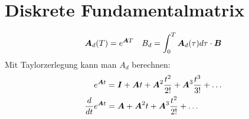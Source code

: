     \section{Diskrete Fundamentalmatrix}
    \begin{tcolorbox}[colback=white!10!white,colframe=green!30!black,title=Definition] 
        \begin{align*}
            \boldsymbol{A}_d(T)= e^{\boldsymbol{A}T} && B_d = \int_{0}^{T}\boldsymbol{A}_d
        (\tau)d\tau    \cdot \boldsymbol{B} 
\end{align*}
Mit Taylorzerlegung kann man $A_d$ berechnen:
\begin{align*}
    e^{\boldsymbol{A}t}  &= \boldsymbol{I} + \boldsymbol{A}t+\boldsymbol{A}^2\frac{t^2}{2!} + \boldsymbol{A}^3\frac{t^3}{3!}+ \ldots\\
    \frac{d}{dt}e^{\boldsymbol{A}t} &= \boldsymbol{A} + \boldsymbol{A}^2t+\boldsymbol{A}^3\frac{t^2}{2!} + \ldots
\end{align*}
    \end{tcolorbox}    
